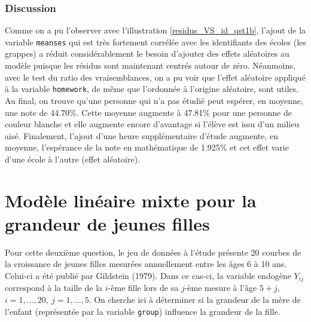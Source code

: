 \documentclass{article}
\begin{document}
	\subsubsection*{Discussion}
		Comme on a pu l'observer avec l'illustration \ref{residus_VS_id_qst1b}, l'ajout de la variable \texttt{meanses} qui est très fortement corrélée avec les identifiants des écoles (les grappes) a réduit considérablement le besoin d'ajouter des effets aléatoires au modèle puisque les résidus sont maintenant centrés autour de zéro. Néanmoins, avec le test du ratio des vraisemblances, on a pu voir que l'effet aléatoire appliqué à la variable \texttt{homework}, de même que l'ordonnée à l'origine aléatoire, sont utiles.\\
		
		Au final, on trouve qu'une personne qui n'a pas étudié peut espérer, en moyenne, une note de 44.70\%. Cette moyenne augmente à 47.81\% pour une personne de couleur blanche et elle augmente encore d'avantage si l'élève est issu d'un milieu aisé. Finalement, l'ajout d'une heure supplémentaire d'étude augmente, en moyenne, l'espérance de la note en mathématique de 1.925\% et cet effet varie d'une école à l'autre (effet aléatoire).
		
	
\section{Modèle linéaire mixte pour la grandeur de jeunes filles}
	Pour cette deuxième question, le jeu de données à l'étude présente 20 courbes de la croissance de jeunes filles mesurées annuellement entre les âges 6 à 10 ans. Celui-ci a été publié par Gildstein (1979). Dans ce cas-ci, la variable endogène $Y_{ij}$ correspond à la taille de la $i$-ème fille lors de sa $j$-ème mesure à l'âge $5+j$, $i=1,\dots,20,\ j=1,\dots,5$. On cherche ici à déterminer si la grandeur de la mère de l'enfant (représentée par la variable \texttt{group}) influence la grandeur de la fille.
	
\end{document}
